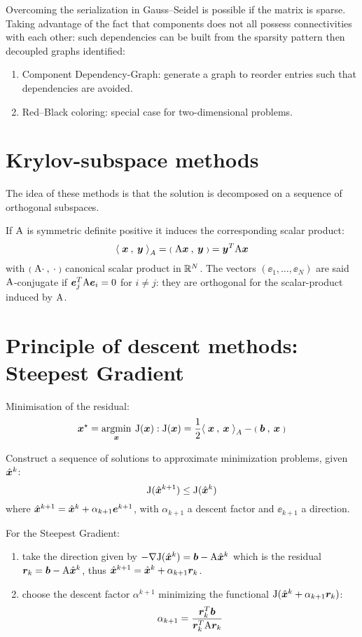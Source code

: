 Overcoming the serialization in Gauss--Seidel is possible if the matrix is sparse.
Taking advantage of the fact that components does not all possess connectivities with each other: such dependencies can be built from the sparsity pattern then decoupled graphs identified:
\begin{enumerate}
\item Component Dependency-Graph: generate a graph to reorder entries such that dependencies are avoided.
\item Red--Black coloring: special case for two-dimensional problems.
\end{enumerate}



\section{Krylov-subspace methods}

The idea of these methods is that the solution is decomposed on a sequence of orthogonal subspaces.

If ${\mathrm A}$ is symmetric definite positive it induces the corresponding scalar product:
\[
{{\mathbf\langle}\;{\boldsymbol x}\:,\: {\boldsymbol y} \;{\rangle}}_A = {{\scriptstyle\mathbf{(}}\;{\mathrm A} {\boldsymbol x}\:,\: {\boldsymbol y} \;{\scriptstyle\mathbf{)}}} = {\boldsymbol y}^T{\mathrm A}{\boldsymbol x}
\]
with ${{\scriptstyle\mathbf{(}}\;{\mathrm A} \cdot\:,\: \cdot \;{\scriptstyle\mathbf{)}}}$ canonical scalar product in ${\mathbb{R}^N}$.
The vectors $(\ee_1, \dots, \ee_N)$ are said ${\mathrm A}$-conjugate if ${\boldsymbol e}_j^T{\mathrm A}{\boldsymbol e}_i = 0$ for $i\neq j$: they are orthogonal for the scalar-product induced by ${\mathrm A}$.

\section{Principle of descent methods: Steepest Gradient }

Minimisation of the residual:
\begin{equation*}
{\boldsymbol x}^\star = \mathop{\underset{{\boldsymbol x}}{\mathrm{argmin}}}\:{\mathrm J}({\boldsymbol x}) : {\mathrm J}({\boldsymbol x}) = \frac{1}{2}{{\mathbf\langle}\;{\boldsymbol x}\:,\: {\boldsymbol x} \;{\rangle}}_A - {{\scriptstyle\mathbf{(}}\;{\boldsymbol b}\:,\: {\boldsymbol x} \;{\scriptstyle\mathbf{)}}}
\end{equation*}

Construct a sequence of solutions to approximate minimization problems, given $\hat{\boldsymbol x}^k$:
\[
{\mathrm J}(\hat{\boldsymbol x}^{k+1}) \leq {\mathrm J}(\hat{\boldsymbol x}^k)
\]
where $\hat{\boldsymbol x}^{k+1} = \hat{\boldsymbol x}^{k} + \alpha_{k+1} {\boldsymbol e}^{k+1}$, with $\alpha_{k+1}$ a descent factor and $\ee_{k+1}$ a direction.

\medskip
For the Steepest Gradient:
\begin{enumerate}
\item take the direction given by $-\nabla{\mathrm J}(\hat{\boldsymbol x}^k) = {\boldsymbol b} - {\mathrm A} \hat{\boldsymbol x}^k$ which is the residual ${\boldsymbol r}_k = {\boldsymbol b} - {\mathrm A}\hat{\boldsymbol x}^k$, thus $\hat{\boldsymbol x}^{k+1} = \hat{\boldsymbol x}^{k} + \alpha_{k+1} {\boldsymbol r}_k$.
\item choose the descent factor $\alpha^{k+1}$ minimizing the functional ${\mathrm J}(\hat{\boldsymbol x}^{k} + \alpha_{k+1} {\boldsymbol r}_k)$:
\[
\alpha_{k+1} = \frac{{\boldsymbol r}_k^T{\boldsymbol b}}{{\boldsymbol r}_k^T{\mathrm A}{\boldsymbol r}_k}
\]
\end{enumerate}

